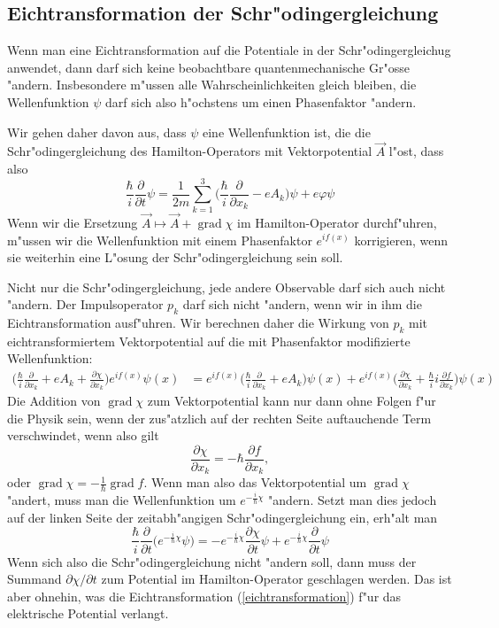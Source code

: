 \subsection{Eichtransformation der Schr"odingergleichung}
Wenn man eine Eichtransformation auf die Potentiale in der
Schr"odingergleichug anwendet, dann darf sich keine beobachtbare
quantenmechanische Gr"osse "andern. Insbesondere m"ussen alle
Wahrscheinlichkeiten gleich bleiben, die Wellenfunktion
$\psi$ darf sich also h"ochstens um einen Phasenfaktor "andern.

Wir gehen daher davon aus, dass $\psi$ eine Wellenfunktion ist,
die die Schr"odingergleichung des Hamilton-Operators mit Vektorpotential
$\vec A$ l"ost, dass also
\[
\frac{\hbar}{i}\frac{\partial}{\partial t}\psi
=
\frac1{2m}\sum_{k=1}^3\biggl(\frac{\hbar}{i}\frac{\partial}{\partial x_k}-eA_k\biggr)\psi
+e\varphi\psi
\]
Wenn wir die Ersetzung
$\vec A\mapsto \vec A+\operatorname{grad}\chi$
im Hamilton-Operator durchf"uhren, m"ussen wir die Wellenfunktion
mit einem Phasenfaktor $e^{if(x)}$ korrigieren, wenn sie weiterhin
eine L"osung der Schr"odingergleichung sein soll.

Nicht nur die Schr"odingergleichung, jede andere Observable darf sich
auch nicht "andern.
Der Impulsoperator $p_k$ darf sich nicht "andern, wenn wir in ihm die
Eichtransformation ausf"uhren.
Wir berechnen daher die Wirkung von $p_k$ mit eichtransformiertem
Vektorpotential auf die mit Phasenfaktor modifizierte Wellenfunktion:
\begin{align*}
\biggl(
\frac{\hbar}{i}\frac{\partial}{\partial x_k}+eA_k
+\frac{\partial\chi}{\partial x_k}
\biggr)e^{if(x)}\psi(x)
&=
e^{if(x)}
\biggl(
\frac{\hbar}{i}\frac{\partial}{\partial x_k}+eA_k
\biggr)\psi(x)
+
e^{if(x)}
\biggl(
\frac{\partial\chi}{\partial x_k}
+
\frac{\hbar}{i}i\frac{\partial f}{\partial x_k}
\biggr)
\psi(x)
\end{align*}
Die Addition von $\operatorname{grad}\chi$ zum Vektorpotential
kann nur dann ohne Folgen f"ur die Physik sein, wenn der
zus"atzlich auf der rechten Seite auftauchende Term verschwindet,
wenn also gilt
\[
\frac{\partial\chi}{\partial x_k}=-\hbar\frac{\partial f}{\partial x_k},
\]
oder $\operatorname{grad}\chi=-\frac1{\hbar}\operatorname{grad}f$.
Wenn man also das Vektorpotential um $\operatorname{grad}\chi$ "andert,
muss man die Wellenfunktion um $e^{-\frac{i}{\hbar}\chi}$ "andern. 
Setzt man dies jedoch auf der linken Seite der zeitabh"angigen
Schr"odingergleichung ein, erh"alt man
\[
\frac{\hbar}{i}\frac{\partial}{\partial t}
\bigl(
e^{-\frac{i}{\hbar}\chi}
\psi
\bigr)
=
-
e^{-\frac{i}{\hbar}\chi}
\frac{\partial\chi}{\partial t}
\psi
+
e^{-\frac{i}{\hbar}\chi}
\frac{\partial}{\partial t}
\psi
\]
Wenn sich also die Schr"odingergleichung nicht "andern soll, dann
muss der Summand $\partial\chi/\partial t$ zum Potential im
Hamilton-Operator geschlagen werden.
Das ist aber ohnehin, was die Eichtransformation (\ref{eichtransformation})
f"ur das elektrische Potential verlangt.

